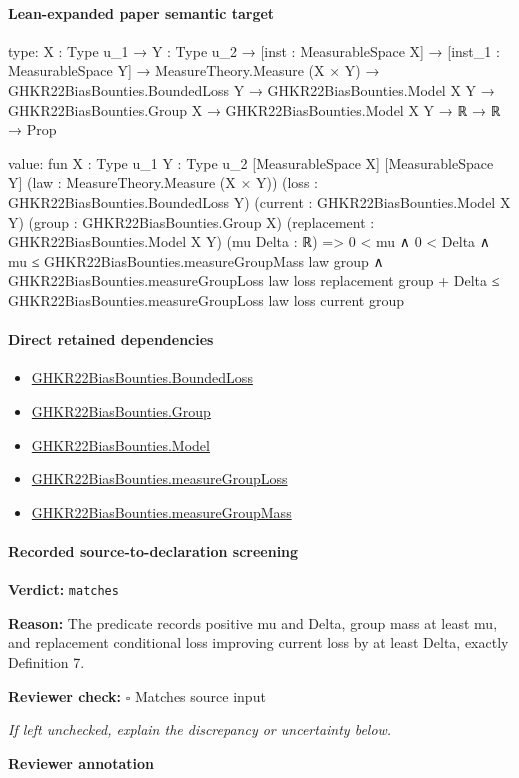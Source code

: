 \documentclass[10pt]{article}
\newcommand{\reviewerbox}{%
  \par\noindent\fbox{\parbox{0.96\linewidth}{\rule{0pt}{0.38in}}}\par
}
\newcommand{\reviewmatch}[1]{%
  \par\noindent\textbf{Reviewer check:} $\square$\; #1\par
  \noindent\emph{If left unchecked, explain the discrepancy or uncertainty below.}\par
}
\begin{document}
\paragraph{Lean-expanded paper semantic target}
\begin{ReviewVerbatim}
type:
{X : Type u_1} →
  {Y : Type u_2} →
    [inst : MeasurableSpace X] →
      [inst_1 : MeasurableSpace Y] →
        MeasureTheory.Measure (X × Y) →
          GHKR22BiasBounties.BoundedLoss Y →
            GHKR22BiasBounties.Model X Y → GHKR22BiasBounties.Group X → GHKR22BiasBounties.Model X Y → ℝ → ℝ → Prop

value:
fun {X : Type u_1} {Y : Type u_2} [MeasurableSpace X] [MeasurableSpace Y] (law : MeasureTheory.Measure (X × Y))
    (loss : GHKR22BiasBounties.BoundedLoss Y) (current : GHKR22BiasBounties.Model X Y)
    (group : GHKR22BiasBounties.Group X) (replacement : GHKR22BiasBounties.Model X Y) (mu Delta : ℝ) =>
  0 < mu ∧
    0 < Delta ∧
      mu ≤ GHKR22BiasBounties.measureGroupMass law group ∧
        GHKR22BiasBounties.measureGroupLoss law loss replacement group + Delta ≤
          GHKR22BiasBounties.measureGroupLoss law loss current group
\end{ReviewVerbatim}

\paragraph{Direct retained dependencies}
\begin{itemize}\raggedright
\item \hyperlink{paper-prerequisite-ef6c319b0770dad4}{GHKR22\allowbreak{}Bias\allowbreak{}Bounties.\allowbreak{}Bounded\allowbreak{}Loss}
\item \hyperlink{paper-prerequisite-cc7214115b27106f}{GHKR22\allowbreak{}Bias\allowbreak{}Bounties.\allowbreak{}Group}
\item \hyperlink{paper-prerequisite-333127605c12eba8}{GHKR22\allowbreak{}Bias\allowbreak{}Bounties.\allowbreak{}Model}
\item \hyperlink{paper-prerequisite-c9cff6ba9100bf1c}{GHKR22\allowbreak{}Bias\allowbreak{}Bounties.\allowbreak{}measure\allowbreak{}Group\allowbreak{}Loss}
\item \hyperlink{paper-prerequisite-ac1a5a161f2dd3f6}{GHKR22\allowbreak{}Bias\allowbreak{}Bounties.\allowbreak{}measure\allowbreak{}Group\allowbreak{}Mass}
\end{itemize}
\paragraph{Recorded source-to-declaration screening}
\textbf{Verdict:} \texttt{matches}
\\
{\raggedright
\textbf{Reason:} The predicate records positive mu and Delta, group mass at least mu, and replacement conditional loss improving current loss by at least Delta, exactly Definition 7.\allowbreak{}
\par}
\reviewmatch{Matches source input}
\noindent\textbf{Reviewer annotation}\par
\reviewerbox
\clearpage
\hypertarget{paper-prerequisite-3fd4c7633d9c94db}{}
\end{document}
